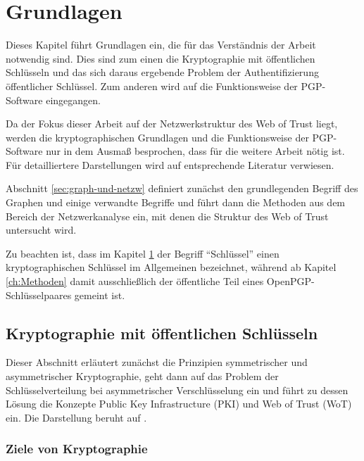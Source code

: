 
\chapter{Grundlagen}
\label{ch:Grundlagen}

Dieses Kapitel führt Grundlagen ein, die für das Verständnis der
Arbeit notwendig sind. Dies sind zum einen die Kryptographie mit
öffentlichen Schlüsseln und das sich daraus ergebende Problem der
Authentifizierung öffentlicher Schlüssel. Zum anderen wird auf die
Funktionsweise der PGP-Software eingegangen.

Da der Fokus dieser Arbeit auf der Netzwerkstruktur des Web of Trust
liegt, werden die kryptographischen Grundlagen und die Funktionsweise
der PGP-Software nur in dem Ausmaß besprochen, dass für die weitere
Arbeit nötig ist. Für detailliertere Darstellungen wird auf
entsprechende Literatur verwiesen.

Abschnitt \ref{sec:graph-und-netzw} definiert zunächst den
grundlegenden Begriff des Graphen und einige verwandte Begriffe und
führt dann die Methoden aus dem Bereich der Netzwerkanalyse ein, mit
denen die Struktur des Web of Trust untersucht wird.

Zu beachten ist, dass im Kapitel \ref{ch:Grundlagen} der Begriff
``Schlüssel'' einen kryptographischen Schlüssel im Allgemeinen
bezeichnet, während ab Kapitel \ref{ch:Methoden} damit
ausschließlich der öffentliche Teil eines OpenPGP-Schlüsselpaares
gemeint ist.

\section{Kryptographie mit öffentlichen Schlüsseln}
\label{ch:Grundlagen:sec:PublicKeyCrypto}

Dieser Abschnitt erläutert zunächst die Prinzipien symmetrischer
und asymmetrischer Kryptographie, geht dann auf das Problem der
Schlüsselverteilung bei asymmetrischer Verschlüsselung ein und
führt zu dessen Lösung die Konzepte Public Key Infrastructure
(PKI) und Web of Trust (WoT) ein. Die Darstellung beruht auf
\cite{Menezes1996}.

\subsection{Ziele von Kryptographie}
\label{sec:ziele-von-krypt}

